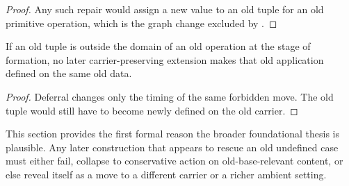 \begin{proof}
Any such repair would assign a new value to an old tuple for an old primitive operation, which is the graph change excluded by .
\end{proof}

\begin{corollary}\label{cor:no-deferred}
If an old tuple is outside the domain of an old operation at the stage of formation, no later carrier-preserving extension makes that old application defined on the same old data.
\end{corollary}

\begin{proof}
Deferral changes only the timing of the same forbidden move. The old tuple would still have to become newly defined on the old carrier.
\end{proof}

\begin{remark}
This section provides the first formal reason the broader foundational thesis is plausible. Any later construction that appears to rescue an old undefined case must either fail, collapse to conservative action on old-base-relevant content, or else reveal itself as a move to a different carrier or a richer ambient setting.
\end{remark}
